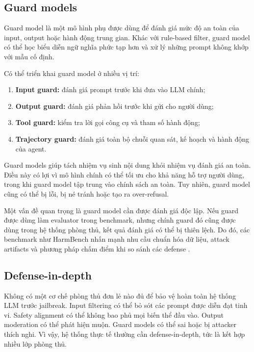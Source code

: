 \subsection{Guard models}
\label{subsec:guard-models}

Guard model là một mô hình phụ được dùng để đánh giá mức độ an toàn của
input, output hoặc hành động trung gian. Khác với rule-based filter, guard
model có thể học biểu diễn ngữ nghĩa phức tạp hơn và xử lý những prompt
không khớp với mẫu cố định.

Có thể triển khai guard model ở nhiều vị trí:

\begin{enumerate}[leftmargin=1.2cm]
    \item \textbf{Input guard:}
    đánh giá prompt trước khi đưa vào LLM chính;

    \item \textbf{Output guard:}
    đánh giá phản hồi trước khi gửi cho người dùng;

    \item \textbf{Tool guard:}
    kiểm tra lời gọi công cụ và tham số hành động;

    \item \textbf{Trajectory guard:}
    đánh giá toàn bộ chuỗi quan sát, kế hoạch và hành động của agent.
\end{enumerate}

Guard models giúp tách nhiệm vụ sinh nội dung khỏi nhiệm vụ đánh giá an
toàn. Điều này có lợi vì mô hình chính có thể tối ưu cho khả năng hỗ trợ
người dùng, trong khi guard model tập trung vào chính sách an toàn. Tuy
nhiên, guard model cũng có thể bị lỗi, bị né tránh hoặc tạo ra over-refusal.

Một vấn đề quan trọng là guard model cần được đánh giá độc lập. Nếu guard
được dùng làm evaluator trong benchmark, nhưng chính guard đó cũng được
dùng trong hệ thống phòng thủ, kết quả đánh giá có thể bị thiên lệch. Do
đó, các benchmark như HarmBench nhấn mạnh nhu cầu chuẩn hóa dữ liệu, attack
artifacts và phương pháp chấm điểm khi so sánh các defense
\cite{mazeika2024harmbench}.

\subsection{Defense-in-depth}
\label{subsec:defense-in-depth}

Không có một cơ chế phòng thủ đơn lẻ nào đủ để bảo vệ hoàn toàn hệ thống
LLM trước jailbreak. Input filtering có thể bỏ sót các prompt được diễn
đạt tinh vi. Safety alignment có thể không bao phủ mọi biến thể đầu vào.
Output moderation có thể phát hiện muộn. Guard models có thể sai hoặc bị
attacker thích nghi. Vì vậy, hệ thống thực tế thường cần defense-in-depth,
tức là kết hợp nhiều lớp phòng thủ.

